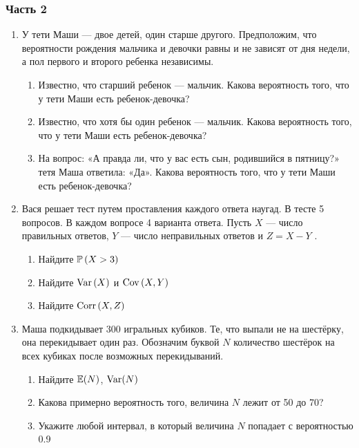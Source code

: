\subsubsection*{Часть 2}

\begin{enumerate}

\item У тети Маши — двое детей, один старше другого. Предположим, что вероятности рождения мальчика и девочки равны и не зависят от дня недели, а пол первого и второго ребенка независимы.
\begin{enumerate}
\item Известно, что старший ребенок — мальчик. Какова
вероятность того, что у тети Маши есть ребенок-девочка?
\item Известно, что хотя бы один ребенок — мальчик. Какова
вероятность того, что у тети Маши есть ребенок-девочка?
\item На вопрос: «А правда ли, что у вас есть сын, родившийся в пятницу?» тетя Маша ответила: «Да». Какова
вероятность того, что у тети Маши есть ребенок-девочка?
\end{enumerate}


\item Вася решает тест путем проставления каждого ответа наугад. В тесте 5 вопросов. В каждом вопросе 4 варианта ответа. Пусть  $X$  — число правильных ответов,  $Y$  — число неправильных ответов и  $Z=X-Y$ .

\begin{enumerate}
\item Найдите  $\P\left(X>3\right)$

\item Найдите  $\Var\left(X\right)$  и  $\Cov\left(X,Y\right)$

\item Найдите  $\Corr\left(X,Z\right)$
\end{enumerate}


\item Маша подкидывает 300 игральных кубиков. Те, что выпали не на шестёрку, она перекидывает один раз. Обозначим буквой $N$ количество шестёрок на всех кубиках после возможных перекидываний.
\begin{enumerate}
\item Найдите $\E(N)$, $\Var(N)$
\item Какова примерно вероятность того, величина $N$ лежит от 50 до 70?
\item Укажите любой интервал, в который величина $N$ попадает с вероятностью 0.9
\end{enumerate}

\end{enumerate}

